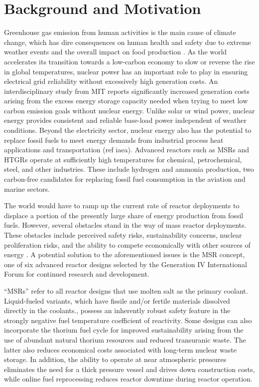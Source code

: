 \section{Background and Motivation}

Greenhouse gas emission from human activities is the main cause of climate
change, which has dire consequences on human health and safety due to extreme
weather events and the overall impact on food production
\cite{mcmichael_global_2004}.
As the world accelerates its transition towards a low-carbon
economy to slow or reverse the rise in global temperatures, nuclear power has
an important role to play in ensuring electrical grid reliability without
excessively high generation costs. An interdisciplinary study from \gls{MIT}
\cite{petti_future_2018} reports significantly increased generation costs
arising from the excess energy storage capacity needed when trying to meet low
carbon emission goals without nuclear energy. Unlike solar or wind power,
nuclear energy provides consistent and reliable base-load power independent of
weather conditions. Beyond the electricity sector, nuclear energy also has the
potential to replace fossil fuels to meet energy demands from industrial
process heat applications and transportation (ref iaea).
Advanced reactors such as \glspl{MSR} and \glspl{HTGR} operate at sufficiently
high temperatures for chemical, petrochemical, steel, and other industries.
These include hydrogen and ammonia production, two carbon-free candidates for
replacing fossil fuel consumption in the aviation and marine sectors.

The world would have to ramp up the current rate of reactor deployments to
displace a portion of the presently large share of energy production from
fossil fuels. However, several obstacles stand in the way of mass
reactor deployments. These obstacles include perceived safety risks,
sustainability concerns, nuclear proliferation
risks, and the ability to compete economically with other sources of energy
\cite{massachusetts_institute_of_technology_future_2003}. A potential solution
to the aforementioned issues is the \gls{MSR} concept, one of six advanced
reactor designs selected by the Generation IV International Forum
\cite{gif_technology_2002} for continued research and development.

``\glspl{MSR}'' refer to all reactor designs that use molten salt as the
primary coolant. Liquid-fueled variants, which have fissile and/or fertile
materials dissolved directly in the coolants.,
possess an inherently robust safety feature in the strongly negative fuel
temperature coefficient of reactivity. Some designs can also incorporate the
thorium fuel cycle for improved sustainability arising from the use of
abundant natural thorium resources and reduced transuranic waste. The
latter also reduces economical costs
associated with long-term nuclear waste storage. In addition, the ability to
operate at near atmospheric pressures eliminates the need for a thick pressure
vessel and drives down construction costs, while online fuel reprocessing
reduces reactor downtime during reactor operation.

